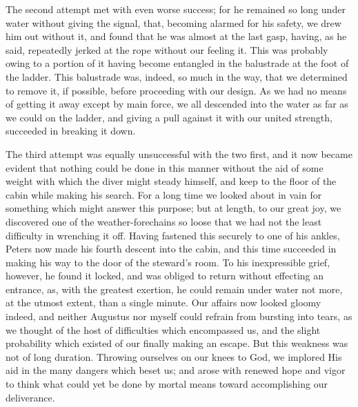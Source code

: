 The second attempt met with even worse success; for he remained so long under
water without giving the signal, that, becoming alarmed for his safety, we drew
him out without it, and found that he was almost at the last gasp, having, as he
said, repeatedly jerked at the rope without our feeling it. This was probably
owing to a portion of it having become entangled in the balustrade at the foot
of the ladder. This balustrade was, indeed, so much in the way, that we
determined to remove it, if possible, before proceeding with our design. As we
had no means of getting it away except by main force, we all descended into the
water as far as we could on the ladder, and giving a pull against it with our
united strength, succeeded in breaking it down. 

The third attempt was equally unsuccessful with the two first, and it now
became evident that nothing could be done in this manner without the aid of some
weight with which the diver might steady himself, and keep to the floor of the
cabin while making his search. For a long time we looked about in vain for
something which might answer this purpose; but at length, to our great joy, we
discovered one of the weather-forechains so loose that we had not the least
difficulty in wrenching it off. Having fastened this securely to one of his
ankles, Peters now made his fourth descent into the cabin, and this time
succeeded in making his way to the door of the steward's room. To his
inexpressible grief, however, he found it locked, and was obliged to return
without effecting an entrance, as, with the greatest exertion, he could remain
under water not more, at the utmost extent, than a single minute. Our affairs
now looked gloomy indeed, and neither Augustus nor myself could refrain from
bursting into tears, as we thought of the host of difficulties which encompassed
us, and the slight probability which existed of our finally making an escape.
But this weakness was not of long duration. Throwing ourselves on our knees to
God, we implored His aid in the many dangers which beset us; and arose with
renewed hope and vigor to think what could yet be done by mortal means toward
accomplishing our deliverance. 

